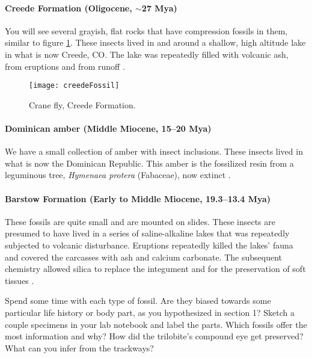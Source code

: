 \paragraph{Creede Formation (Oligocene, $\sim$27 Mya)} You will see several grayish, flat rocks that have compression fossils in them, similar to figure \ref{fig:creedeFossil}. These insects lived in and around a shallow, high altitude lake in what is now Creede, CO. The lake was repeatedly filled with volcanic ash, from eruptions and from runoff \citep{berkeley}.

\begin{figure}[ht!]
  \centering
    \texttt{[image: creedeFossil]}
  \caption{Crane fly, Creede Formation. \citep[][Fig. 1]{carpenter1938fossil}}
  \label{fig:creedeFossil}
\end{figure}

\paragraph{Dominican amber (Middle Miocene, 15--20 Mya)} We have a small collection of amber with insect inclusions. These insects lived in what is now the Dominican Republic. This amber is the fossilized resin from a leguminous tree, \textit{Hymenaea protera} (Fabaceae), now extinct \citep{IturraldeVinent1850}.

\paragraph{Barstow Formation (Early to Middle Miocene, 19.3--13.4 Mya)} These fossils are quite small and are mounted on slides. These insects are presumed to have lived in a series of saline-alkaline lakes that was repeatedly subjected to volcanic disturbance. Eruptions repeatedly killed the lakes' fauna and covered the carcasses with ash and calcium carbonate. The subsequent chemistry allowed silica to replace the integument and for the preservation of soft tissues \citep{PARK01042001}.

\begin{theo}
{}Spend some time with each type of fossil. Are they biased towards some particular life history or body part, as you hypothesized in section 1? Sketch a couple specimens in your lab notebook and label the parts. Which fossils offer the most information and why? How did the trilobite's compound eye get preserved? What can you infer from the trackways?\end{theo}

